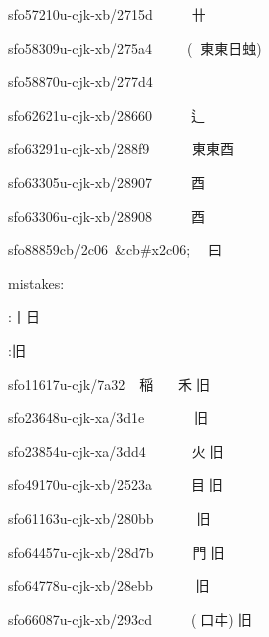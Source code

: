 \begin{multicols}{2}
{sfo57210u-cjk-xb/2715d  {}   {\cnxJzr{}}{\cjk{}卄{\cnxb{}𣍘}}\par
sfo58309u-cjk-xb/275a4  {}   ({\cnxJzr{}}{\cnxJzr{}}{\cjk{}東東日{\cnxa{}䖵}})\par
sfo58870u-cjk-xb/277d4  {}   {\cnxJzr{}}{}\par
sfo62621u-cjk-xb/28660  {}   {\cnxJzr{}}{\cjk{}辶{\cnxb{}𣍘}}\par
sfo63291u-cjk-xb/288f9  {}   {\cnxJzr{}}{\cnxJzr{}}{\cjk{}東東酉}\par
sfo63305u-cjk-xb/28907  {}   {\cnxJzr{}}{\cjk{}酉{\cnxb{}𣍘}}\par
sfo63306u-cjk-xb/28908  {}   {\cnxJzr{}}{酉}\par
sfo88859cb/2c06 \&cb\#x2c06;  {\cnxJzr{}}{曰}\par
\null\par
mistakes:\par
{}:{丨日}\par
{}:{旧}\par
\null\par
sfo11617u-cjk/7a32  {\cjk{}稲}   {\cnxJzr{}}{\cjk{}禾}{\cnxJzr{}}{旧}\par
sfo23648u-cjk-xa/3d1e   {}   {\cnxJzr{}}{}{\cnxJzr{}}{旧}\par
sfo23854u-cjk-xa/3dd4   {}   {\cnxJzr{}}{\cjk{}火}{\cnxJzr{}}{旧}\par
sfo49170u-cjk-xb/2523a  {}   {\cnxJzr{}}{\cjk{}目}{\cnxJzr{}}{旧}\par
sfo61163u-cjk-xb/280bb  {}   {\cnxJzr{}}{}{\cnxJzr{}}{旧}\par
sfo64457u-cjk-xb/28d7b  {}   {\cnxJzr{}}{\cjk{}門}{\cnxJzr{}}{旧}\par
sfo64778u-cjk-xb/28ebb  {}   {\cnxJzr{}}{}{\cnxJzr{}}{旧}\par
sfo66087u-cjk-xb/293cd  {}   {\cnxJzr{}}({\cnxJzr{}}{口{\cnxa{}㐄}}){\cnxJzr{}}{旧}\par
}
\end{multicols}
